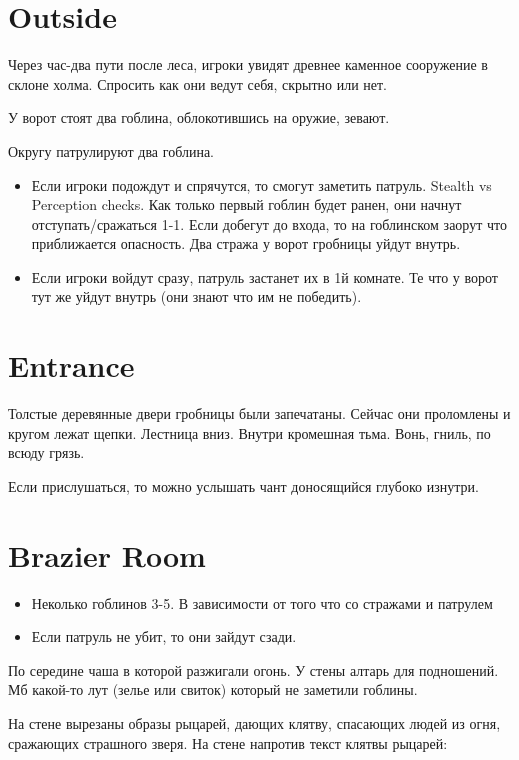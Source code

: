 \documentclass[a5paper,11pt]{book}
\begin{document}
\section{Outside}
Через час-два пути после леса, игроки увидят древнее каменное сооружение в склоне холма. Спросить как они ведут себя, скрытно или нет.

У ворот стоят два гоблина, облокотившись на оружие, зевают.

Округу патрулируют два гоблина.
\begin{itemize}
  \item Если игроки подождут и спрячутся, то смогут заметить патруль. Stealth vs Perception checks. Как только первый гоблин будет ранен, они начнут отступать/сражаться 1-1. Если добегут до входа, то на гоблинском заорут что приближается опасность. Два стража у ворот гробницы уйдут внутрь.
  \item Если игроки войдут сразу, патруль застанет их в 1й комнате. Те что у ворот тут же уйдут внутрь (они знают что им не победить).
\end{itemize}

\section{Entrance}

Толстые деревянные двери гробницы были запечатаны. Сейчас они проломлены и кругом лежат щепки. Лестница вниз. Внутри кромешная тьма. Вонь, гниль, по всюду грязь.

Если прислушаться, то можно услышать чант доносящийся глубоко изнутри.

\section{Brazier Room}

\begin{itemize}
  \item Неколько гоблинов 3-5. В зависимости от того что со стражами и патрулем
  \item Если патруль не убит, то они зайдут сзади.
\end{itemize}

По середине чаша в которой разжигали огонь. У стены алтарь для подношений. Мб какой-то лут (зелье или свиток) который не заметили гоблины.

На стене вырезаны образы рыцарей, дающих клятву, спасающих людей из огня, сражающих страшного зверя. На стене напротив текст клятвы рыцарей:
\end{document}
